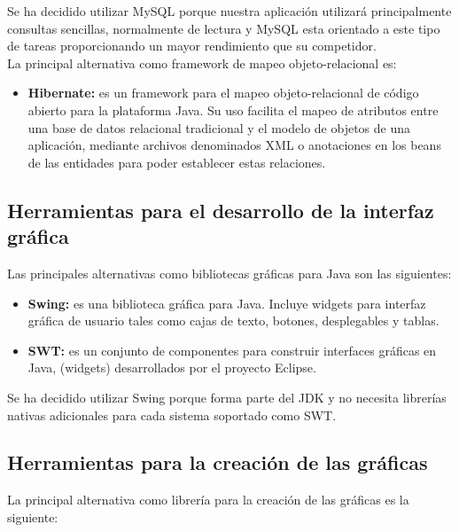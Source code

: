 \documentclass[12pt, a4paper]{book}
\begin{document}
Se ha decidido utilizar MySQL porque nuestra aplicación utilizará principalmente consultas sencillas, normalmente de lectura y MySQL esta orientado a este tipo de tareas proporcionando un mayor rendimiento que su competidor.\\  

La principal alternativa como framework de mapeo objeto-relacional es:

\begin{itemize}
	
	\item \textbf{Hibernate:} es un framework para el mapeo objeto-relacional de código abierto para la plataforma Java. Su uso facilita el mapeo de atributos entre una base de datos relacional tradicional y el modelo de objetos de una aplicación, mediante archivos denominados \gls{XML} o anotaciones en los beans de las entidades para poder establecer estas relaciones.
	
\end{itemize}	



\subsection{Herramientas para el desarrollo de la interfaz gráfica}

Las principales alternativas como bibliotecas gráficas para Java son las siguientes:

\begin{itemize}
	\item \textbf{Swing:} es una biblioteca gráfica para Java. Incluye widgets para interfaz gráfica de usuario tales como cajas de texto, botones, desplegables y tablas.
	
	\item \textbf{SWT:} es un conjunto de componentes para construir interfaces gráficas en Java, (widgets) desarrollados por el proyecto Eclipse. 
\end{itemize}

Se ha decidido utilizar Swing porque forma parte del \gls{JDK} y no necesita librerías nativas adicionales para cada sistema soportado como SWT.

\subsection{Herramientas para la creación de las gráficas}

La principal alternativa como librería para la creación de las gráficas es la siguiente:
\end{document}

